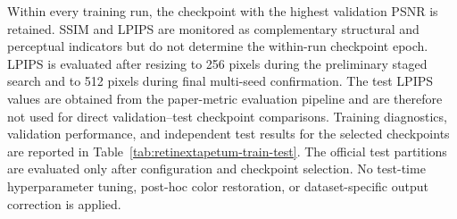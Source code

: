 Within every training run, the checkpoint with the highest validation PSNR is
retained. SSIM and LPIPS are monitored as complementary structural and
perceptual indicators but do not determine the within-run checkpoint epoch.
LPIPS is evaluated after resizing to 256 pixels during the preliminary staged
search and to 512 pixels during final multi-seed confirmation. The test LPIPS
values are obtained from the paper-metric evaluation pipeline and are
therefore not used for direct validation--test checkpoint comparisons.
Training diagnostics, validation performance, and independent test results for
the selected checkpoints are reported in
Table~\ref{tab:retinextapetum-train-test}. The official test partitions are
evaluated only after configuration and checkpoint selection. No test-time
hyperparameter tuning, post-hoc color restoration, or dataset-specific output
correction is applied.
